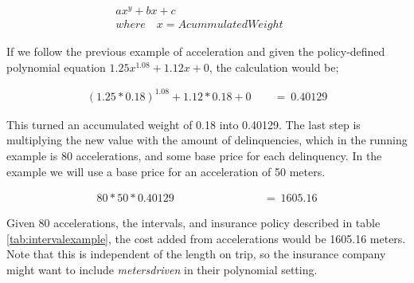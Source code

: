 \begin{align*}
ax^{y} + bx + c\quad \quad \quad \quad \quad \quad \quad \quad \quad \quad \quad \\
where\quad x = AcummulatedWeight
\end{align*}

If we follow the previous example of acceleration and given the policy-defined polynomial equation $1.25x^{1.08} +  1.12x + 0$, the calculation would be;

\begin{align*}
(1.25 * 0.18)^{1.08} +  1.12 * 0.18 + 0\quad \quad  =\ 0.40129
\end{align*}

This turned an accumulated weight of 0.18 into 0.40129. The last step is multiplying the new value with the amount of delinquencies, which in the running example is 80 accelerations, and some base price for each delinquency. In the example we will use a base price for an acceleration of 50 meters.

\begin{align*}
80 * 50 * 0.40129\quad \quad \quad \quad \quad \quad \quad \quad =\ 1605.16
\end{align*}


Given 80 accelerations, the intervals, and insurance policy described in table \ref{tab:intervalexample}, the cost added from accelerations would be 1605.16 meters. Note that this is independent of the length on trip, so the insurance company might want to include \textit{metersdriven} in their polynomial setting.